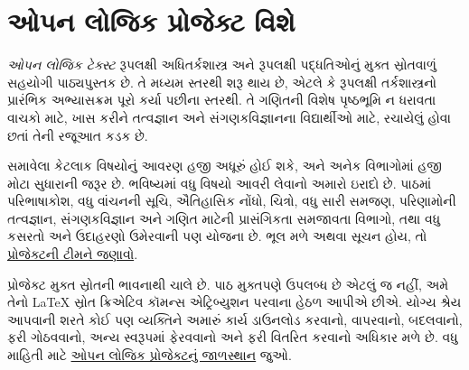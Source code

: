 \chapter*{ઓપન લોજિક પ્રોજેક્ટ વિશે}

\textit{ઓપન લોજિક ટેક્સ્ટ} રૂપલક્ષી અધિતર્કશાસ્ત્ર અને
રૂપલક્ષી પદ્ધતિઓનું મુક્ત સ્રોતવાળું સહયોગી પાઠ્યપુસ્તક છે.
તે મધ્યમ સ્તરથી શરૂ થાય છે, એટલે કે રૂપલક્ષી તર્કશાસ્ત્રનો
પ્રારંભિક અભ્યાસક્રમ પૂરો કર્યા પછીના સ્તરથી.
તે ગણિતની વિશેષ પૃષ્ઠભૂમિ ન ધરાવતા વાચકો માટે,
ખાસ કરીને તત્વજ્ઞાન અને સંગણકવિજ્ઞાનના વિદ્યાર્થીઓ માટે,
રચાયેલું હોવા છતાં તેની રજૂઆત કડક છે.

સમાવેલા કેટલાક વિષયોનું આવરણ હજી અધૂરું હોઈ શકે,
અને અનેક વિભાગોમાં હજી મોટા સુધારાની જરૂર છે.
ભવિષ્યમાં વધુ વિષયો આવરી લેવાનો અમારો ઇરાદો છે.
પાઠમાં પરિભાષાકોશ, વધુ વાંચનની સૂચિ, ઐતિહાસિક નોંધો,
ચિત્રો, વધુ સારી સમજણ, પરિણામોની તત્વજ્ઞાન,
સંગણકવિજ્ઞાન અને ગણિત માટેની પ્રાસંગિકતા સમજાવતા વિભાગો,
તથા વધુ કસરતો અને ઉદાહરણો ઉમેરવાની પણ યોજના છે.
ભૂલ મળે અથવા સૂચન હોય, તો
\href{https://github.com/OpenLogicProject/OpenLogic/wiki/Contributing}{પ્રોજેક્ટની ટીમને જણાવો}.

પ્રોજેક્ટ મુક્ત સ્રોતની ભાવનાથી ચાલે છે.
પાઠ મુક્તપણે ઉપલબ્ધ છે એટલું જ નહીં,
અમે તેનો LaTeX સ્રોત ક્રિએટિવ કૉમન્સ એટ્રિબ્યુશન પરવાના હેઠળ આપીએ છીએ.
યોગ્ય શ્રેય આપવાની શરતે કોઈ પણ વ્યક્તિને અમારું કાર્ય
ડાઉનલોડ કરવાનો, વાપરવાનો, બદલવાનો, ફરી ગોઠવવાનો,
અન્ય સ્વરૂપમાં ફેરવવાનો અને ફરી વિતરિત કરવાનો અધિકાર મળે છે.
વધુ માહિતી માટે
\href{http://openlogicproject.org/}{ઓપન લોજિક પ્રોજેક્ટનું જાળસ્થાન} જુઓ.

